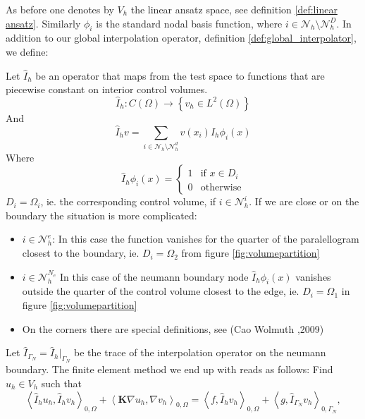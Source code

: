 \documentclass[../Main/main.tex]{subfiles}
\begin{document}
	\par 
	As before one denotes by $V_h$ the linear ansatz space, see definition \ref{def:linear ansatz}. Similarly $\phi_i$ is the standard nodal basis function, where $i \in \mathcal{N}_h \setminus \mathcal{N}_h^D$.
	In addition to our global interpolation operator, definition \ref{def:global_interpolator}, we define:
	\begin{definition} \label{def:piecewise_interpolator}
		Let $\hat{I}_h$ be an operator that maps from the test space to functions that are piecewise constant on interior control volumes.
		\begin{equation*}
			\hat{I}_h:C(\Omega)\rightarrow \left \{ v_h \in L^2(\Omega) \right \}
		\end{equation*}
		And
		\begin{equation*}
			\hat{I}_h v = \sum_{i\in \mathcal{N}_h\setminus\mathcal{N}_h^d}v(x_i)\hat{I}_h\phi_i(x)
		\end{equation*}
		Where
		\begin{equation}
			\hat{I}_h\phi_i(x)=\left\{\begin{matrix}
				1 & \text{if } x\in D_i\\ 
				0 & \text{otherwise}
			\end{matrix}\right.
		\end{equation}
		$D_i = \Omega_i$, ie. the corresponding control volume, if $i \in \mathcal{N}_h^i$. If we are close or on the boundary the situation is more complicated: 
		\begin{itemize}
			\item $i \in \mathcal{N}_h^e$: In this case the function vanishes for the quarter of the paralellogram closest to the boundary, ie. $D_i = \Omega_2$ from figure \ref{fig:volumepartition}
			\item $i \in \mathcal{N}_h^{N_e}$ In this case of the neumann boundary node $	\hat{I}_h\phi_i(x)$ vanishes outside the quarter of the control volume closest to the edge, ie. $D_i = \Omega_1$ in figure \ref{fig:volumepartition}
			\item On the corners there are special definitions, see (Cao Wolmuth \cite{https://doi.org/10.1002/num.20525},2009)
		\end{itemize} 
	\end{definition}
	Let $\hat{I}_{\Gamma_N} = \hat{I}_{h}|_{\Gamma_N}$ be the trace of the interpolation operator on the neumann boundary.
	The finite element method we end up with reads as follows: Find $u_h\in V_h$ such that
	\begin{equation} \label{eq:modified_fem}
			\left \langle \hat{I}_h u_h,\hat{I}_h v_h \right \rangle_{0,\Omega} +   \left \langle \pmb{K} \nabla u_h,\nabla v_h \right \rangle_{0,\Omega} = \left \langle f,\hat{I}_h v_h \right \rangle_{0,\Omega} + \left \langle g,\hat{I}_{\Gamma_N} v_h \right \rangle_{0,\Gamma_N},
	\end{equation}
\end{document}
